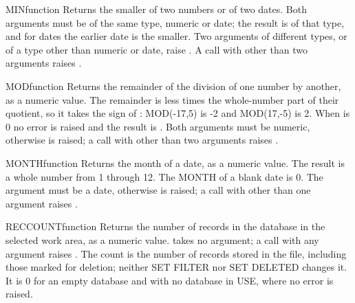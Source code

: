 \begin{XbaseEntry}{MIN}{function}
Returns the smaller of two numbers or of two dates.
\Syntax
{}
\Usage
Both arguments must be of the same type, numeric or date; the result is of that type, and for dates the earlier date is the smaller. Two arguments of different types, or of a type other than numeric or date, raise . A call with other than two arguments raises .
\Examples
{}
\end{XbaseEntry}

\begin{XbaseEntry}{MOD}{function}
Returns the remainder of the division of one number by another, as a numeric value.
\Syntax
{}
\Usage
The remainder is  less  times the whole-number part of their quotient, so it takes the sign of : MOD(-17,5) is -2 and MOD(17,-5) is 2. When  is 0 no error is raised and the result is . Both arguments must be numeric, otherwise  is raised; a call with other than two arguments raises .
\Examples
{}
\end{XbaseEntry}

\begin{XbaseEntry}{MONTH}{function}
Returns the month of a date, as a numeric value.
\Syntax
{}
\Usage
The result is a whole number from 1 through 12. The MONTH of a blank date is 0. The argument must be a date, otherwise  is raised; a call with other than one argument raises .
\Examples
{}
\end{XbaseEntry}

\begin{XbaseEntry}{RECCOUNT}{function}
Returns the number of records in the database in the selected work area, as a numeric value.
\Syntax
{}
\Usage
{} takes no argument; a call with any argument raises . The count is the number of records stored in the file, including those marked for deletion; neither SET FILTER nor SET DELETED changes it. It is 0 for an empty database and with no database in USE, where no error is raised.
\Examples
{}
\end{XbaseEntry}

